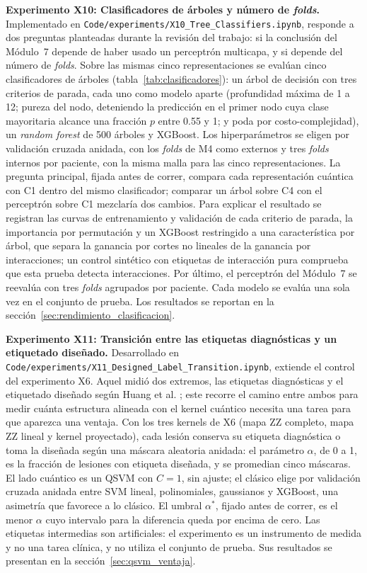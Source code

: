 \textbf{Experimento X10: Clasificadores de árboles y número de \textit{folds}.} Implementado en
\texttt{Code/}\allowbreak\texttt{experiments/}\allowbreak\texttt{X10\_Tree\_Classifiers.ipynb}, responde a dos preguntas
planteadas durante la revisión del trabajo: si la conclusión del Módulo~7 depende de haber usado un perceptrón multicapa, y
si depende del número de \textit{folds}. Sobre las mismas cinco representaciones se evalúan cinco clasificadores de árboles
(tabla~\ref{tab:clasificadores}): un árbol de decisión con tres criterios de parada, cada uno como modelo aparte (profundidad
máxima de 1 a 12; pureza del nodo, deteniendo la predicción en el primer nodo cuya clase mayoritaria alcance una fracción
$p$ entre 0.55 y 1; y poda por costo-complejidad), un \textit{random forest} de 500 árboles y XGBoost. Los hiperparámetros
se eligen por validación cruzada anidada, con los \textit{folds} de M4 como externos y tres \textit{folds} internos por paciente,
con la misma malla para las cinco representaciones. La pregunta principal, fijada antes de correr, compara cada representación
cuántica con C1 dentro del mismo clasificador; comparar un árbol sobre C4 con el perceptrón sobre C1 mezclaría dos cambios. Para
explicar el resultado se registran las curvas de entrenamiento y validación de cada criterio de parada, la importancia por
permutación y un XGBoost restringido a una característica por árbol, que separa la ganancia por cortes no lineales de la ganancia
por interacciones; un control sintético con etiquetas de interacción pura comprueba que esta prueba detecta interacciones. Por
último, el perceptrón del Módulo~7 se reevalúa con tres \textit{folds} agrupados por paciente. Cada modelo se evalúa una sola vez
en el conjunto de prueba. Los resultados se reportan en la sección~\ref{sec:rendimiento_clasificacion}.

\textbf{Experimento X11: Transición entre las etiquetas diagnósticas y un etiquetado diseñado.} Desarrollado en
\texttt{Code/}\allowbreak\texttt{experiments/}\allowbreak\texttt{X11\_Designed\_Label\_Transition.ipynb}, extiende el control
del experimento X6. Aquel midió dos extremos, las etiquetas diagnósticas y el etiquetado diseñado según Huang et al.
\cite{huang2021power}; este recorre el camino entre ambos para medir cuánta estructura alineada con el kernel cuántico necesita
una tarea para que aparezca una ventaja. Con los tres kernels de X6 (mapa ZZ completo, mapa ZZ lineal y kernel proyectado),
cada lesión conserva su etiqueta diagnóstica o toma la diseñada según una máscara aleatoria anidada: el parámetro $\alpha$, de 0
a 1, es la fracción de lesiones con etiqueta diseñada, y se promedian cinco máscaras. El lado cuántico es un QSVM con $C = 1$,
sin ajuste; el clásico elige por validación cruzada anidada entre SVM lineal, polinomiales, gaussianos y XGBoost, una asimetría
que favorece a lo clásico. El umbral $\alpha^{*}$, fijado antes de correr, es el menor $\alpha$ cuyo intervalo para la diferencia
queda por encima de cero. Las etiquetas intermedias son artificiales: el experimento es un instrumento de medida y no una tarea
clínica, y no utiliza el conjunto de prueba. Sus resultados se presentan en la sección~\ref{sec:qsvm_ventaja}.

